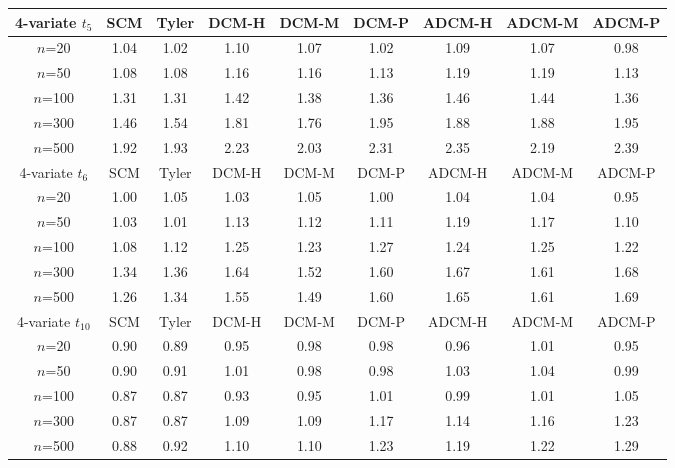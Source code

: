 \begin{table}[t]
\begin{scriptsize}
    \begin{tabular}{c|cc|ccc|ccc}
    \hline
    4-variate $t_5$    & SCM  & Tyler & DCM-H & DCM-M & DCM-P & ADCM-H & ADCM-M & ADCM-P \\ \hline
    $n$=20             & 1.04 & 1.02  & 1.10   & 1.07   & 1.02  & 1.09    & 1.07    & 0.98   \\
    $n$=50             & 1.08 & 1.08  & 1.16   & 1.16   & 1.13  & 1.19    & 1.19    & 1.13   \\
    $n$=100            & 1.31 & 1.31  & 1.42   & 1.38   & 1.36  & 1.46    & 1.44    & 1.36   \\
    $n$=300            & 1.46 & 1.54  & 1.81   & 1.76   & 1.95  & 1.88    & 1.88    & 1.95   \\
    $n$=500            & 1.92 & 1.93  & 2.23   & 2.03   & 2.31  & 2.35    & 2.19    & 2.39   \\ \hline
    4-variate $t_6$    & SCM  & Tyler & DCM-H & DCM-M & DCM-P & ADCM-H & ADCM-M & ADCM-P \\ \hline
    $n$=20             & 1.00 & 1.05  & 1.03   & 1.05   & 1.00  & 1.04    & 1.04    & 0.95   \\
    $n$=50             & 1.03 & 1.01  & 1.13   & 1.12   & 1.11  & 1.19    & 1.17    & 1.10   \\
    $n$=100            & 1.08 & 1.12  & 1.25   & 1.23   & 1.27  & 1.24    & 1.25    & 1.22   \\
    $n$=300            & 1.34 & 1.36  & 1.64   & 1.52   & 1.60  & 1.67    & 1.61    & 1.68   \\
    $n$=500            & 1.26 & 1.34  & 1.55   & 1.49   & 1.60  & 1.65    & 1.61    & 1.69   \\ \hline
    4-variate $t_{10}$ & SCM  & Tyler & DCM-H & DCM-M & DCM-P & ADCM-H & ADCM-M & ADCM-P \\ \hline
    $n$=20             & 0.90 & 0.89  & 0.95   & 0.98   & 0.98  & 0.96    & 1.01    & 0.95   \\
    $n$=50             & 0.90 & 0.91  & 1.01   & 0.98   & 0.98  & 1.03    & 1.04    & 0.99   \\
    $n$=100            & 0.87 & 0.87  & 0.93   & 0.95   & 1.01  & 0.99    & 1.01    & 1.05   \\
    $n$=300            & 0.87 & 0.87  & 1.09   & 1.09   & 1.17  & 1.14    & 1.16    & 1.23   \\
    $n$=500            & 0.88 & 0.92  & 1.10   & 1.10   & 1.23  & 1.19    & 1.22    & 1.29   \\ \hline

\end{tabular}
\end{scriptsize}
\end{table}
